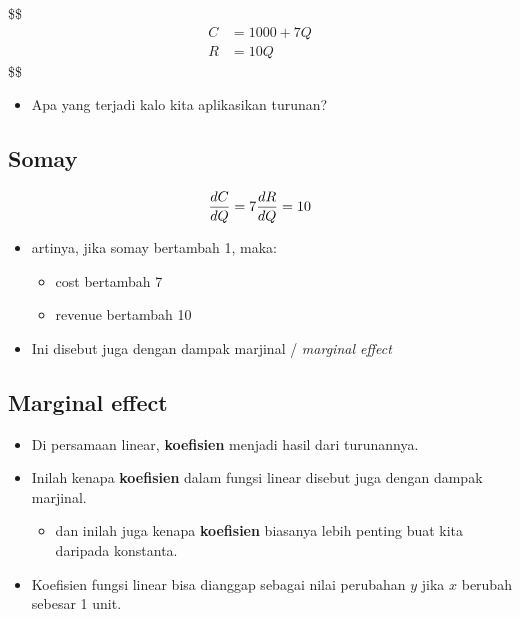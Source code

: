 \documentclass[
  letterpaper,
  DIV=11,
  numbers=noendperiod]{scrartcl}
\providecommand{\tightlist}{%
  \setlength{\itemsep}{0pt}\setlength{\parskip}{0pt}}\usepackage{longtable,booktabs,array}
\begin{document}
\$\$ \begin{align}
C&=1000+7Q \\

R&=10Q

\end{align} \$\$

\begin{itemize}
\tightlist
\item
  Apa yang terjadi kalo kita aplikasikan turunan?
\end{itemize}

\hypertarget{somay-1}{%
\subsection{Somay}\label{somay-1}}

\[
\frac{dC}{dQ}=7 \\
\frac{dR}{dQ}=10
\]

\begin{itemize}
\item
  artinya, jika somay bertambah 1, maka:

  \begin{itemize}
  \item
    cost bertambah 7
  \item
    revenue bertambah 10
  \end{itemize}
\item
  Ini disebut juga dengan dampak marjinal / \emph{marginal effect}
\end{itemize}

\hypertarget{marginal-effect}{%
\subsection{Marginal effect}\label{marginal-effect}}

\begin{itemize}
\item
  Di persamaan linear, \textbf{koefisien} menjadi hasil dari turunannya.
\item
  Inilah kenapa \textbf{koefisien} dalam fungsi linear disebut juga
  dengan dampak marjinal.

  \begin{itemize}
  \tightlist
  \item
    dan inilah juga kenapa \textbf{koefisien} biasanya lebih penting
    buat kita daripada konstanta.
  \end{itemize}
\item
  Koefisien fungsi linear bisa dianggap sebagai nilai perubahan \(y\)
  jika \(x\) berubah sebesar 1 unit.
\end{itemize}
\end{document}
